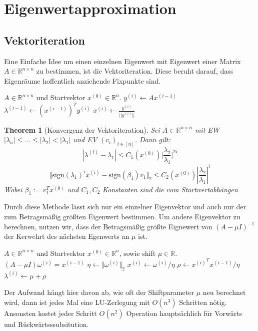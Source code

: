 \documentclass[10pt,a4paper]{article}
\newtheorem{theorem}{Theorem}
\begin{document}
	\section{Eigenwertapproximation}
	\subsection{Vektoriteration}
	Eine Einfache Idee um einen einzelnen Eigenwert mit Eigenwert einer Matrix $A\in \mathbb{R}^{n\times n}$ zu bestimmen, ist die Vektoriteration. Diese beruht darauf, dass Eigenräume hoffentlich anziehende Fixpunkte sind.
	\begin{algorithm}
		\caption{Vektoriteration}
		\begin{algorithmic}
			\Require $A\in \mathbb{R}^{n\times n}$ und Startvektor $x^{(0)}\in \mathbb{R}^n$.
				\State $y^{(i)} \leftarrow Ax^{(i-1)}$
				\State $\lambda^(i-1) \leftarrow (x^(i-1))^Ty^{(i)}$
				\State $x^{(i)} \leftarrow \frac{y^{(i)}}{||y^{(i)}||}$
			\EndFor
		\end{algorithmic}
	\end{algorithm}
	\begin{theorem}[Konvergenz der Vektoriteration]
		Sei $A\in \mathbb{R}^{n \times n}$ mit EW $|\lambda_n| \leq ... \leq |\lambda_2| < |\lambda_1|$ und EV $(v_i)_{i\in [n]}$. Dann gilt:
		$$|\lambda^{(i)}-\lambda_1| \leq C_1(x^{(0)})\vert\frac{\lambda_2}{\lambda_1}\vert^{2i}$$
		$$\Vert\text{sign}(\lambda_1)^ix^{(i)} - \text{sign}(\beta_1)v_1\Vert_2 \leq C_2(x^{(0)})|\frac{\lambda_2}{\lambda_1}|^i$$
		Wobei $\beta_1 := v^T_1x^{(0)}$ und $C_1, C_2$ Konstanten sind die vom Startwertabhängen
	\end{theorem}
	Durch diese Methode lässt sich nur ein einzelner Eigenvektor und auch nur der zum Betragsmäßig größten Eigenwert bestimmen. Um andere Eigenvektor zu berechnen, nutzen wir, dass der Betragsmäßig größte Eignewert von $(A-\mu I)^{-1}$ der Kerwehrt des nächsten Egenwerts an $\mu$ ist.
	\begin{algorithm}[H]
		\caption{Inverse Vektoriteration}
		\begin{algorithmic}
			\Require $A\in \mathbb{R}^{n\times n}$ und Startvektor $x^{(0)}\in \mathbb{R}^n$, sowie shift $\mu \in \mathbb{R}$.
			\For{$i=1,2,...$}
			\State $(A-\mu I)\omega^{(i)} = x^{(i-1)}$
			\State $\eta \leftarrow \Vert \omega^{(i)}\Vert_2$
			\State $x^{(i)} \leftarrow \omega^{(i)}/\eta$
			\State $\rho \leftarrow {x^{(i)}}^Tx^{(i-1)}/\eta$
			\State $\lambda^{(i)} \leftarrow \mu + \rho$
			\EndFor
		\end{algorithmic}
	\end{algorithm}
	Der Aufwand hängt hier davon ab, wie oft der Shiftparameter $\mu$ neu berechnet wird, dann ist jedes Mal eine LU-Zerlegung mit $O(n^3)$ Schritten nötig. Ansonsten kostet jeder Schritt $O(n^2)$ Operation hauptsächlich für Vorwärts und Rückwärtsssubsitution. \\
\end{document}
